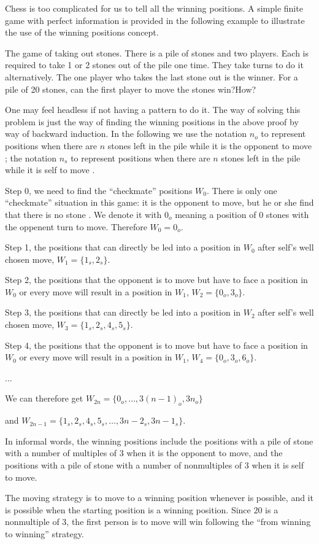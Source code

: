Chess is too complicated for us to tell all the winning
positions. A simple finite game with perfect information is provided
in the following example to illustrate the use of the winning
positions concept.

\begin{example}
The game of taking out stones. There is a pile of stones and two
players. Each is required to take 1 or 2 stones out of the pile one
time. They take turns to do it alternatively. The one player who takes
the last stone out is the winner. For a pile of 20 stones, can the
first player to move the stones win?How?

One may feel headless if not having a pattern to do it.  The way of
solving this problem is just the way of finding the winning positions
in the above proof by way of backward induction. In the following we
use the notation $n_o$  to represent positions when there are
$n$ stones left in the pile while it is the opponent to move ; the notation $n_s$  to represent positions when there are
$n$ stones left in the pile while it is self to move .

Step 0, we need to find the ``checkmate'' positions $W_0$.  There is only one
``checkmate'' situation in this game: it is the opponent  to move, but
he or she find that there
is no stone . We denote it with $0_o$ meaning  a position of 0 stones with the
oppenent turn to move. Therefore $W_0={0_o}$.

Step 1, the positions that can directly be led into a position in
$W_0$ after self's well chosen move,   $W_1=\{1_s,2_s\}$.

Step 2,  the positions that the opponent is to move but have  to face a
position in $W_0$ or every move will result in a position in $W_1$,
$W_2=\{0_o, 3_o\}$.

Step 3, the positions that can directly be led into a position in
$W_2$ after self's well chosen move, $W_3=\{1_s, 2_s, 4_s,5_s\}$.

Step 4,  the positions that the opponent is to move but have to face a
position in $W_0$ or every move will result in a position in $W_1$,
$W_4=\{0_o, 3_o, 6_o\}$.

...

We can therefore get $W_{2n}=\{0_o,\dots,3(n-1)_o, 3n_o\}$ 

and
$W_{2n-1}=\{1_s,2_s,4_s,5_s,\dots, 3n-2_s,3n-1_s\}$.

In informal words, the winning positions include the positions with
a pile of stone with a number of multiples of $3$ when it is the
opponent to move, and the positions with a pile of stone with a number
of nonmultiples of  $3$ when it is self to move.

The moving strategy is to move to a winning position whenever is
possible, and it is possible when the starting position is a winning
position. Since $20$ is a nonmultiple of $3$, the first person is to
move will win following the ``from winning to winning'' strategy.


\end{example}


